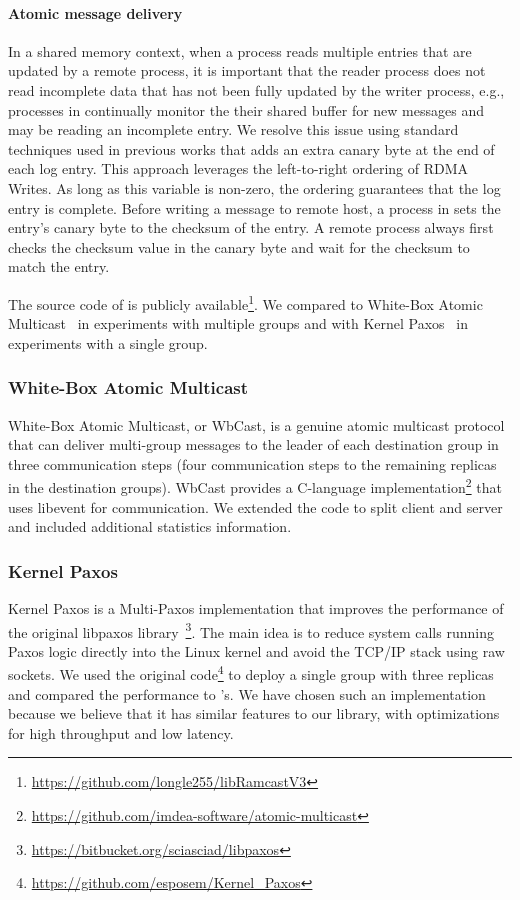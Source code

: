 \paragraph{Atomic message delivery}
In a shared memory context, when a process reads multiple entries that are
updated by a remote process, it is important that the reader process does not
read incomplete data that has not been fully updated by the writer process,
e.g., processes in \libname continually monitor the their shared buffer for new
messages and may be reading an incomplete entry. We resolve this issue using
standard techniques used in previous works \cite{APUS,FaRM,kalia2014using,
islam2012high} that adds an extra canary byte at the end of each log entry. This
approach leverages the left-to-right ordering of RDMA Writes. As long as this
variable is non-zero, the ordering guarantees that the log entry is complete.
Before writing a message to remote host, a process in \libname sets the entry’s
canary byte to the checksum of the entry. A remote process always first checks
the checksum value in the canary byte and wait for the checksum to match the
entry.

The source code of \libname is publicly
available\footnote{\url{https://github.com/longle255/libRamcastV3}}. We compared
\libname to White-Box Atomic Multicast~\cite{gotsman2019white} in experiments
with multiple groups and with Kernel Paxos~\cite{esposito2018kernel} in
experiments with a single group.

\subsubsection*{White-Box Atomic Multicast}
White-Box Atomic Multicast, or WbCast, is a genuine atomic multicast protocol that can deliver multi-group messages to the leader of each destination group in three communication steps (four communication steps to the remaining replicas in the destination groups).
 WbCast provides a C-language implementation\footnote{\url{https://github.com/imdea-software/atomic-multicast}} that uses libevent for communication.
 We extended the code to split client and server and included additional statistics information.

\subsubsection*{Kernel Paxos}
Kernel Paxos is a Multi-Paxos implementation that improves the performance of the original libpaxos library~\footnote{\url{https://bitbucket.org/sciasciad/libpaxos}}.
The main idea is to reduce system calls running Paxos logic directly into the Linux kernel and avoid the TCP/IP stack using raw sockets. 
We used the original code\footnote{\url{https://github.com/esposem/Kernel_Paxos}} to deploy a single group with three replicas and compared the performance to \libname's.
We have chosen such an implementation because we believe that it has similar features to our library, with optimizations for high throughput and low latency.
